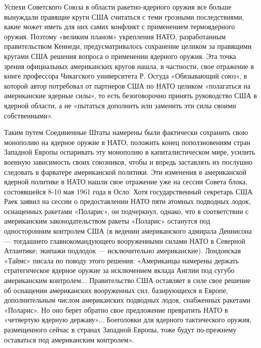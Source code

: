 \documentclass[12pt, a4paper, openany]{book}
\begin{document}
	Успехи Советского Союза в области ракетно-ядерного оружия все больше вынуждали правящие круги США считаться с теми грозными последствиями, какие может иметь для них самих конфликт с применением термоядерного оружия. Поэтому «великим планом» укрепления НАТО, разработанным правительством Кеннеди, предусматривалось сохранение целиком за правящими кругами США решения вопроса о применении ядерного оружия. Эта точка зрения официальных американских кругов нашла, в частности, свое отражение в книге профессора Чикагского университета Р. Осгуда «Обязывающий союз», в которой автор потребовал от партнеров США по НАТО целиком «полагаться на американские ядерные силы», то есть безоговорочно принять руководство США в ядерной области, а не «пытаться дополнить или заменить эти силы своими собственными».
	
	Таким путем Соединенные Штаты намерены были фактически сохранить свою монополию на ядерное оружие в НАТО, положить конец поползновениям стран Западной Европы оспаривать эту монополию в капиталистическом мире, усилить военную зависимость своих союзников, чтобы и впредь заставлять их послушно следовать в фарватере американской политики. Эти изменения в американской ядерной политике в НАТО нашли свое отражение уже на сессии Совета блока, состоявшейся 8-10 мая 1961 года в Осло. Хотя государственный секретарь США Раек заявил на сессии о предоставлении НАТО пяти атомных подводных лодок, оснащенных ракетами «Поларис», он подчеркнул, однако, что в соответствии с американским законодательством ракеты «Поларис» останутся под односторонним контролем США (в ведении американского адмирала Деннисона — тогдашнего главнокомандующего вооруженными силами НАТО в Северной Атлантике; экипажи подлодок — исключительно американские). Лондонская «Таймс» писала по поводу этого решения: «Американцы намерены держать стратегическое ядерное оружие за исключением вклада Англии под сугубо американским контролем... Правительство США оставляет в силе свое решение об оснащении американских вооруженных сил, базирующихся в Европе, дополнительным числом американских подводных лодок, снабженных ракетами «Поларис». Но оно берет обратно свое предложение превратить НАТО в «четвертую ядерную державу»... Боеголовки для ядерного тактического оружия, размещенного сейчас в странах Западной Европы, тоже будут по-прежнему оставаться под американским контролем».
	
\end{document}
